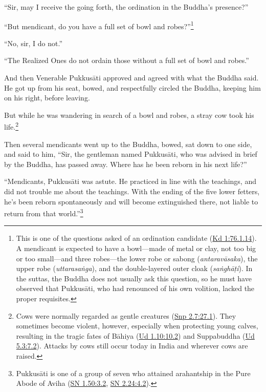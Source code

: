 \documentclass[12pt,openany]{book}%
\begin{document}
“Sir, may I receive the going forth, the ordination in the Buddha’s presence?” 

“But mendicant, do you have a full set of bowl and robes?”\footnote{This is one of the questions asked of an ordination candidate (\href{https://suttacentral.net/pli-tv-kd1/en/sujato\#76.1.14}{Kd 1:76.1.14}). A mendicant is expected to have a bowl—made of metal or clay, not too big or too small—and three robes—the lower robe or sabong (\textit{\textsanskrit{antaravāsaka}}), the upper robe (\textit{\textsanskrit{uttarasaṅga}}), and the double-layered outer cloak (\textit{\textsanskrit{saṅghāṭi}}). In the suttas, the Buddha does not usually ask this question, so he must have observed that \textsanskrit{Pukkusāti}, who had renounced of his own volition, lacked the proper requisites. } 

“No, sir, I do not.” 

“The Realized Ones do not ordain those without a full set of bowl and robes.” 

And then Venerable \textsanskrit{Pukkusāti} approved and agreed with what the Buddha said. He got up from his seat, bowed, and respectfully circled the Buddha, keeping him on his right, before leaving. 

But while he was wandering in search of a bowl and robes, a stray cow took his life.\footnote{Cows were normally regarded as gentle creatures (\href{https://suttacentral.net/snp2.7/en/sujato\#27.1}{Snp 2.7:27.1}). They sometimes become violent, however, especially when protecting young calves, resulting in the tragic fates of \textsanskrit{Bāhiya} (\href{https://suttacentral.net/ud1.10/en/sujato\#10.2}{Ud 1.10:10.2}) and Suppabuddha (\href{https://suttacentral.net/ud5.3/en/sujato\#7.2}{Ud 5.3:7.2}). Attacks by cows still occur today in India and wherever cows are raised. } 

Then several mendicants went up to the Buddha, bowed, sat down to one side, and said to him, “Sir, the gentleman named \textsanskrit{Pukkusāti}, who was advised in brief by the Buddha, has passed away. Where has he been reborn in his next life?” 

“Mendicants, \textsanskrit{Pukkusāti} was astute. He practiced in line with the teachings, and did not trouble me about the teachings. With the ending of the five lower fetters, he’s been reborn spontaneously and will become extinguished there, not liable to return from that world.”\footnote{\textsanskrit{Pukkusāti} is one of a group of seven who attained arahantship in the Pure Abode of Aviha (\href{https://suttacentral.net/sn1.50/en/sujato\#3.2}{SN 1.50:3.2}, \href{https://suttacentral.net/sn2.24/en/sujato\#4.2}{SN 2.24:4.2}). } 
\end{document}
